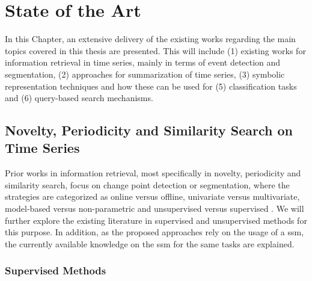 
%

\chapter{State of the Art}
\label{cha:stateofart}

In this Chapter, an extensive delivery of the existing works regarding the main topics covered in this thesis are presented. This will include (1) existing works for information retrieval in time series, mainly in terms of event detection and segmentation, (2) approaches for summarization of time series, (3) symbolic representation techniques and how these can be used for (5) classification tasks and (6) query-based search mechanisms.

\section{Novelty, Periodicity and Similarity Search on Time Series} %
\label{sec:if_timeseries}


Prior works in information retrieval, most specifically in novelty, periodicity and similarity search, focus on change point detection or segmentation, where the strategies are categorized as online versus offline, univariate versus multivariate, model-based versus non-parametric and unsupervised versus supervised \cite{cpd_alan, review_1, review_2}. We will further explore the existing literature in supervised and unsupervised methods for this purpose. In addition, as the proposed approaches rely on the usage of a \gls{ssm}, the currently available knowledge on the \gls{ssm} for the same tasks are explained.

\subsection{Supervised Methods}

